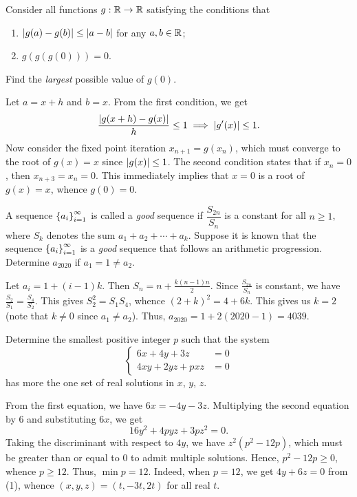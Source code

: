 \begin{question}[0]\label{A::2020-O-1-14}
    Consider all functions $g : \mathbb{R} \to \mathbb{R}$ satisfying the conditions that
    \begin{enumerate}
    \item $\left\lvert g(a) - g(b) \right\rvert \leq \left\lvert a - b \right\rvert$ for any $a, b \in \mathbb{R}$;
    \item $g(g(g(0))) = 0$.
    \end{enumerate}
    Find the \textit{largest} possible value of $g(0)$.
\end{question}

Let $a = x+h$ and $b = x$. From the first condition, we get \[\frac{\left\lvert g(x+h) - g(x) \right\rvert}{h} \leq 1 \implies \left\lvert g'(x) \right\rvert \leq 1.\] Now consider the fixed point iteration $x_{n+1} = g(x_n)$, which must converge to the root of $g(x) = x$ since $\left\lvert g(x) \right\rvert \leq 1$. The second condition states that if $x_n = 0$, then $x_{n+3} = x_n = 0$. This immediately implies that $x = 0$ is a root of $g(x) = x$, whence $g(0) = 0$.

\begin{question}[4039]\label{A::2020-O-1-15}
    A sequence $\left\lbrace a_i \right\rbrace_{i=1}^\infty$ is called a \textit{good} sequence if $\dfrac{S_{2n}}{S_n}$ is a constant for all $n \geq 1$, where $S_k$ denotes the sum $a_1 + a_2 + \cdots + a_k$. Suppose it is known that the sequence $\left\lbrace a_i \right\rbrace_{i = 1}^\infty$ is a \textit{good} sequence that follows an arithmetic progression. Determine $a_{2020}$ if $a_1 = 1 \neq a_2$.
\end{question}

Let $a_i = 1 + (i-1)k$. Then $S_n = n + \frac{k(n-1)n}{2}$. Since $\frac{S_{2n}}{S_n}$ is constant, we have $\frac{S_2}{S_1} = \frac{S_4}{S_2}$. This gives $S_2^2 = S_1 S_4$, whence $(2+k)^2 = 4 + 6k$. This gives us $k = 2$ (note that $k \neq 0$ since $a_1 \neq a_2$). Thus, $a_{2020} = 1 + 2(2020-1) = 4039$.

\begin{question}[12]\label{A::2020-O-1-16}
    Determine the smallest positive integer $p$ such that the system \[\left\{
    \begin{aligned}
        6x + 4y + 3z &= 0\\
        4xy + 2yz + pxz &= 0
    \end{aligned}\right.\] has more the one set of real solutions in $x$, $y$, $z$.
\end{question}

From the first equation, we have $6x = -4y - 3z$. Multiplying the second equation by 6 and substituting $6x$, we get \[16y^2 + 4pyz + 3pz^2 = 0. \tag{1}\] Taking the discriminant with respect to $4y$, we have $z^2(p^2 - 12p)$, which must be greater than or equal to 0 to admit multiple solutions. Hence, $p^2 - 12p \geq 0$, whence $p \geq 12$. Thus, $\min p = 12$. Indeed, when $p = 12$, we get $4y + 6z = 0$ from (1), whence $(x, y, z) = (t, -3t, 2t)$ for all real $t$.

